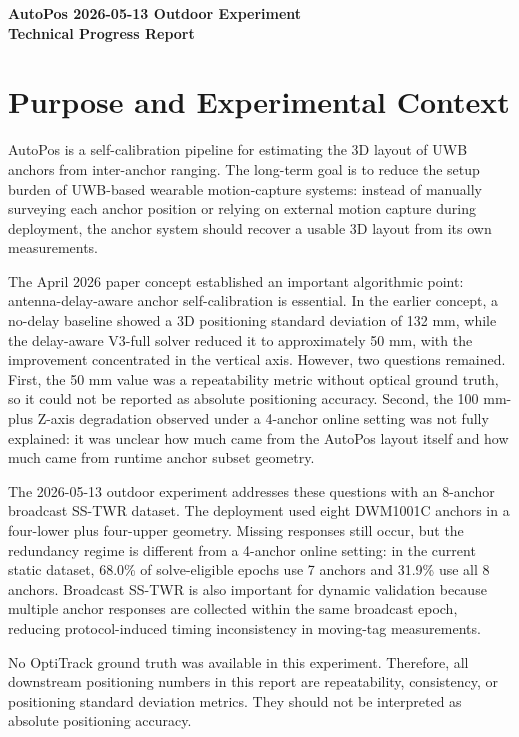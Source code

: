 \documentclass[11pt]{article}
\begin{document}
\begin{center}
    \Large\textbf{AutoPos 2026-05-13 Outdoor Experiment}\\
    \large\textbf{Technical Progress Report}
\end{center}
\vspace{-0.8\baselineskip}

\section{Purpose and Experimental Context}

AutoPos is a self-calibration pipeline for estimating the 3D layout of UWB anchors from inter-anchor ranging. The long-term goal is to reduce the setup burden of UWB-based wearable motion-capture systems: instead of manually surveying each anchor position or relying on external motion capture during deployment, the anchor system should recover a usable 3D layout from its own measurements.

The April 2026 paper concept established an important algorithmic point: antenna-delay-aware anchor self-calibration is essential. In the earlier concept, a no-delay baseline showed a 3D positioning standard deviation of 132 mm, while the delay-aware V3-full solver reduced it to approximately 50 mm, with the improvement concentrated in the vertical axis. However, two questions remained. First, the 50 mm value was a repeatability metric without optical ground truth, so it could not be reported as absolute positioning accuracy. Second, the 100 mm-plus Z-axis degradation observed under a 4-anchor online setting was not fully explained: it was unclear how much came from the AutoPos layout itself and how much came from runtime anchor subset geometry.

The 2026-05-13 outdoor experiment addresses these questions with an 8-anchor broadcast SS-TWR dataset. The deployment used eight DWM1001C anchors in a four-lower plus four-upper geometry. Missing responses still occur, but the redundancy regime is different from a 4-anchor online setting: in the current static dataset, 68.0\% of solve-eligible epochs use 7 anchors and 31.9\% use all 8 anchors. Broadcast SS-TWR is also important for dynamic validation because multiple anchor responses are collected within the same broadcast epoch, reducing protocol-induced timing inconsistency in moving-tag measurements.

No OptiTrack ground truth was available in this experiment. Therefore, all downstream positioning numbers in this report are repeatability, consistency, or positioning standard deviation metrics. They should not be interpreted as absolute positioning accuracy.
\end{document}
